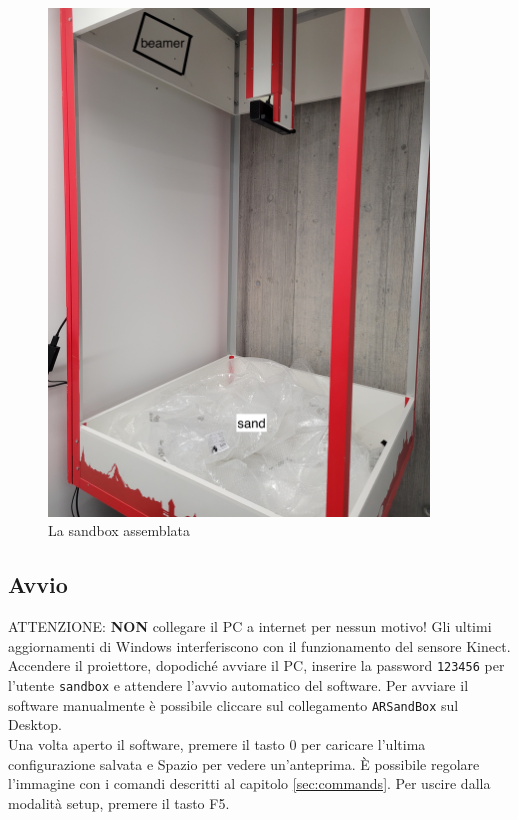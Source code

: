 \documentclass[12pt]{article}
\begin{document}
		\begin{figure}[H]
			\centering
			\includegraphics[width=0.9\textwidth]{img/sandbox.jpg}
			\caption*{La sandbox assemblata}
		\end{figure}
		
		
	\subsection{Avvio}

		ATTENZIONE: \textbf{NON} collegare il PC a internet per nessun motivo! Gli ultimi aggiornamenti
		di Windows interferiscono con il funzionamento del sensore Kinect.\\

		Accendere il proiettore, dopodiché avviare il PC, inserire la password \texttt{123456} per l'utente \texttt{sandbox}
		e attendere l'avvio automatico del software.
		Per avviare il software manualmente è possibile cliccare sul collegamento
		\texttt{ARSandBox} sul Desktop.\\

		Una volta aperto il software, premere il tasto 0 per caricare l'ultima configurazione salvata e
		Spazio per vedere un'anteprima. È possibile regolare l'immagine con i comandi descritti
		al capitolo \ref{sec:commands}. Per uscire dalla modalità setup, premere il tasto F5.\\
\end{document}
